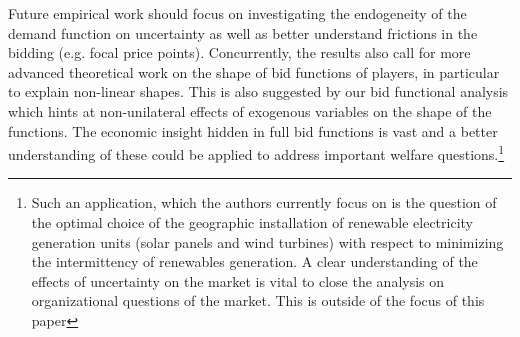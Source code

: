 Future empirical work should focus on investigating the endogeneity of the demand function on uncertainty as well as better understand frictions in the bidding (e.g. focal price points). Concurrently, the results also call for more advanced theoretical work on the shape of bid functions of players, in particular to explain non-linear shapes. This is also suggested by our bid functional analysis which hints at non-unilateral effects of exogenous variables on the shape of the functions. The economic insight hidden in full bid functions is vast and a better understanding of these could be applied to address important welfare questions.\footnote{Such an application, which the authors currently focus on is the question of the optimal choice of the geographic installation of renewable electricity generation units (solar panels and wind turbines) with respect to minimizing the intermittency of renewables generation. A clear understanding of the effects of uncertainty on the market is vital to close the analysis on organizational questions of the market. This is outside of the focus of this paper}\\

